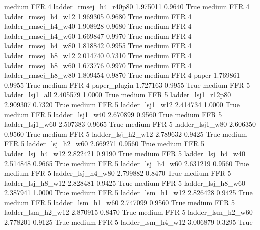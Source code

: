     medium      FFR                 4 ladder_rmsej_h4_r40p80   1.975011      0.9640    True
    medium      FFR                 4    ladder_rmsej_h4_w12   1.969305      0.9680    True
    medium      FFR                 4    ladder_rmsej_h4_w40   1.908928      0.9680    True
    medium      FFR                 4    ladder_rmsej_h4_w60   1.669847      0.9970    True
    medium      FFR                 4    ladder_rmsej_h4_w80   1.818842      0.9955    True
    medium      FFR                 4    ladder_rmsej_h8_w12   2.014740      0.7310    True
    medium      FFR                 4    ladder_rmsej_h8_w60   1.673776      0.9970    True
    medium      FFR                 4    ladder_rmsej_h8_w80   1.809454      0.9870    True
    medium      FFR                 4                  paper   1.769861      0.9955    True
    medium      FFR                 4           paper_plugin   1.727163      0.9955    True
    medium      FFR                 5        ladder_lsj1_all   2.405579      1.0000    True
    medium      FFR                 5     ladder_lsj1_r12p80   2.909307      0.7320    True
    medium      FFR                 5        ladder_lsj1_w12   2.414734      1.0000    True
    medium      FFR                 5        ladder_lsj1_w40   2.670899      0.9560    True
    medium      FFR                 5        ladder_lsj1_w60   2.507383      0.9665    True
    medium      FFR                 5        ladder_lsj1_w80   2.606350      0.9560    True
    medium      FFR                 5      ladder_lsj_h2_w12   2.789632      0.9425    True
    medium      FFR                 5      ladder_lsj_h2_w60   2.669271      0.9560    True
    medium      FFR                 5      ladder_lsj_h4_w12   2.822421      0.9190    True
    medium      FFR                 5      ladder_lsj_h4_w40   2.514848      0.9665    True
    medium      FFR                 5      ladder_lsj_h4_w60   2.631219      0.9560    True
    medium      FFR                 5      ladder_lsj_h4_w80   2.799882      0.8470    True
    medium      FFR                 5      ladder_lsj_h8_w12   2.828481      0.9425    True
    medium      FFR                 5      ladder_lsj_h8_w60   2.387941      1.0000    True
    medium      FFR                 5      ladder_lsm_h1_w12   2.826428      0.9425    True
    medium      FFR                 5      ladder_lsm_h1_w60   2.747099      0.9560    True
    medium      FFR                 5      ladder_lsm_h2_w12   2.870915      0.8470    True
    medium      FFR                 5      ladder_lsm_h2_w60   2.778201      0.9125    True
    medium      FFR                 5      ladder_lsm_h4_w12   3.006879      0.3295    True

